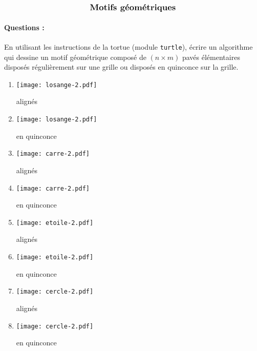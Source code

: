 \documentclass[11pt,a4paper]{article}
\begin{document}
\entete

\autoevaluation


$$\mbox{\textbf{\large Motifs géométriques}}$$


\paragraph{Questions :} 
En utilisant les instructions de la tortue \logo{}
(module \texttt{turtle}), écrire un algorithme qui dessine un motif géométrique
composé de $(n\times m)$ pavés élémentaires disposés régulièrement sur une grille
ou disposés en quinconce sur la grille.
\vspace*{3mm}

\begin{minipage}[t]{7cm}
\begin{enumerate}
\item \begin{minipage}{1.75cm}\texttt{[image: losange-2.pdf]}\end{minipage} alignés
\item \begin{minipage}{1.75cm}\texttt{[image: losange-2.pdf]}\end{minipage} en quinconce
\item \begin{minipage}{1.75cm}\texttt{[image: carre-2.pdf]}\end{minipage} alignés
\item \begin{minipage}{1.75cm}\texttt{[image: carre-2.pdf]}\end{minipage} en quinconce
\item \begin{minipage}{1.75cm}\texttt{[image: etoile-2.pdf]}\end{minipage} alignés
\item \begin{minipage}{1.75cm}\texttt{[image: etoile-2.pdf]}\end{minipage} en quinconce
\item \begin{minipage}{1.75cm}\texttt{[image: cercle-2.pdf]}\end{minipage} alignés
\item \begin{minipage}{1.75cm}\texttt{[image: cercle-2.pdf]}\end{minipage} en quinconce

\end{enumerate}
\end{minipage}
\end{document}
